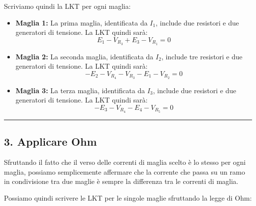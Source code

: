 Scriviamo quindi la LKT per ogni maglia:
\begin{itemize}
    \item \textbf{Maglia 1:} La prima maglia, identificata da \(I_1\), include due resistori e due generatori di tensione. La LKT quindi sarà:
    \begin{equation}
        E_1 - V_{R_3} + E_3 - V_{R_1} = 0
        \label{eq: prima_maglia}
    \end{equation}
    \item \textbf{Maglia 2:} La seconda maglia, identificata da \(I_2\), include tre resistori e due generatori di tensione. La LKT quindi sarà:
    \begin{equation}
        - E_2 - V_{R_4} - V_{R_3} - E_1 - V_{R_2} = 0
        \label{eq: seconda_maglia}
    \end{equation}
    \item \textbf{Maglia 3:} La terza maglia, identificata da \(I_3\), include due resistori e due generatori di tensione. La LKT quindi sarà:
    \begin{equation}
        - E_3 - V_{R_4} - E_4 - V_{R_5} = 0
        \label{eq: terza_maglia}
    \end{equation}
\end{itemize}


\hrule
\subsection*{3. Applicare Ohm}
Sfruttando il fatto che il verso delle correnti di maglia scelto è lo stesso per ogni maglia, possiamo semplicemente affermare che la corrente che passa su un ramo in condivisione tra due maglie è sempre la differenza tra le correnti di maglia.

Possiamo quindi scrivere le LKT per le singole maglie sfruttando la legge di Ohm:

